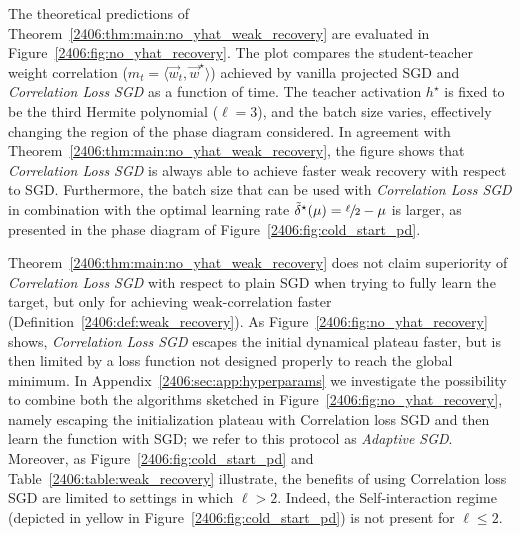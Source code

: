 The theoretical predictions of Theorem~\ref{2406:thm:main:no_yhat_weak_recovery} are evaluated in Figure~\ref{2406:fig:no_yhat_recovery}. The plot compares the student-teacher weight correlation (\(m_t=\langle \vec w_t, \vec w^\star \rangle\)) achieved by vanilla projected SGD and \emph{Correlation Loss SGD} as a function of time. The teacher activation $h^\star$ is fixed to be the third Hermite polynomial ($\ell = 3$), and the batch size varies, effectively changing the region of the phase diagram considered. In agreement with Theorem~\ref{2406:thm:main:no_yhat_weak_recovery}, the figure shows that \emph{Correlation Loss SGD} is always able to achieve faster weak recovery with respect to SGD. Furthermore, the batch size that can be used with \emph{Correlation Loss SGD} in combination with the optimal learning rate $\Tilde{\delta}^\star(\mu) = \sfrac{\ell}{2} - \mu$ is larger, as presented in the phase diagram of Figure~\ref{2406:fig:cold_start_pd}.
\begin{remark}    Theorem~\ref{2406:thm:main:no_yhat_weak_recovery} does not claim superiority of \emph{Correlation Loss SGD} with respect to plain SGD when trying to fully learn the target, but only for achieving weak-correlation faster (Definition~\ref{2406:def:weak_recovery}). As Figure~\ref{2406:fig:no_yhat_recovery} shows, \emph{Correlation Loss SGD} escapes the initial dynamical plateau faster, but is then limited by a loss function not designed properly to reach the global minimum. In Appendix~\ref{2406:sec:app:hyperparams} we investigate the possibility to combine both the algorithms sketched in Figure~\ref{2406:fig:no_yhat_recovery}, namely escaping the initialization plateau with Correlation loss SGD and then learn the function with SGD; we refer to this protocol as \textit{Adaptive SGD}. Moreover, as Figure~\ref{2406:fig:cold_start_pd} and Table~\ref{2406:table:weak_recovery} illustrate, the benefits of using Correlation loss SGD are limited to settings in which $\ell >2$. Indeed, the Self-interaction regime (depicted in yellow in Figure~\ref{2406:fig:cold_start_pd}) is not present for $\ell \le 2$.
\end{remark}

